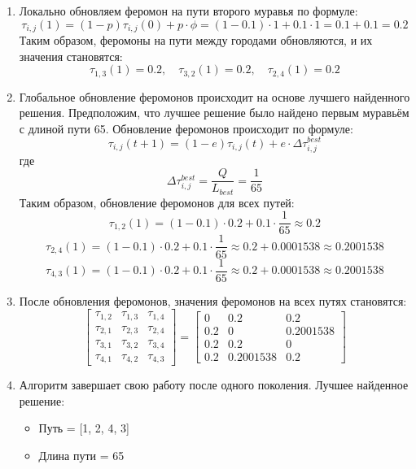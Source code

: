 \documentclass[14pt]{article}
\begin{document}
\begin{enumerate}
    \item Локально обновляем феромон на пути второго муравья по формуле:
    \[
    \tau_{i,j}(1) = (1 - p) \tau_{i,j}(0) + p \cdot \phi = (1 - 0.1) \cdot 1 + 0.1 \cdot 1 = 0.1 + 0.1 = 0.2
    \]
    Таким образом, феромоны на пути между городами обновляются, и их значения становятся:
    \[
    \tau_{1,3}(1) = 0.2, \quad \tau_{3,2}(1) = 0.2, \quad \tau_{2,4}(1) = 0.2
    \]

    \item Глобальное обновление феромонов происходит на основе лучшего найденного решения. Предположим, что лучшее решение было найдено первым муравьём с длиной пути 65. Обновление феромонов происходит по формуле:
    \[
    \tau_{i,j}(t + 1) = (1 - e) \tau_{i,j}(t) + e \cdot \Delta \tau_{i,j}^{best}
    \]
    где
    \[
    \Delta \tau_{i,j}^{best} = \frac{Q}{L_{best}} = \frac{1}{65}
    \]
    Таким образом, обновление феромонов для всех путей:
    \[
    \tau_{1,2}(1) = (1 - 0.1) \cdot 0.2 + 0.1 \cdot \frac{1}{65} \approx 0.2
    \]
    \[
    \tau_{2,4}(1) = (1 - 0.1) \cdot 0.2 + 0.1 \cdot \frac{1}{65} \approx 0.2 + 0.0001538 \approx 0.2001538
    \]
    \[
    \tau_{4,3}(1) = (1 - 0.1) \cdot 0.2 + 0.1 \cdot \frac{1}{65} \approx 0.2 + 0.0001538 \approx 0.2001538
    \]

    \item После обновления феромонов, значения феромонов на всех путях становятся:
    \[
    \begin{bmatrix}
    \tau_{1,2} & \tau_{1,3} & \tau_{1,4} \\
    \tau_{2,1} & \tau_{2,3} & \tau_{2,4} \\
    \tau_{3,1} & \tau_{3,2} & \tau_{3,4} \\
    \tau_{4,1} & \tau_{4,2} & \tau_{4,3}
    \end{bmatrix}
    =
    \begin{bmatrix}
    0 & 0.2 & 0.2 \\
    0.2 & 0 & 0.2001538 \\
    0.2 & 0.2 & 0 \\
    0.2 & 0.2001538 & 0.2
    \end{bmatrix}
    \]

    \item Алгоритм завершает свою работу после одного поколения. Лучшее найденное решение: 
    \begin{itemize}
        \item Путь = [1, 2, 4, 3]
        \item Длина пути = 65
    \end{itemize}
\end{enumerate}
\end{document}
